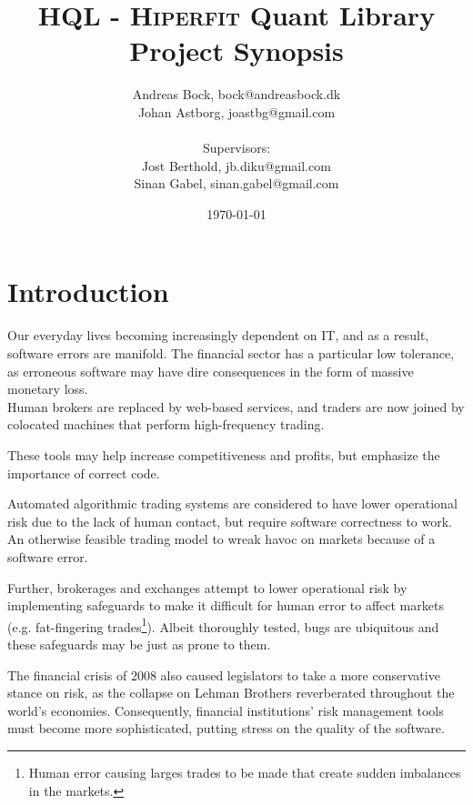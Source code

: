 \documentclass[11pt]{article}
\makeatletter
\def\Author{Andreas Bock, bock@andreasbock.dk\\
Johan Astborg, joastbg@gmail.com\\\\
Supervisors:\\
Jost Berthold, jb.diku@gmail.com\\
Sinan Gabel, sinan.gabel@gmail.com
}
\def\Title{\bf HQL - \textsc{Hiperfit} Quant Library\\ {\Large Project Synopsis}}
\makeatother
\begin{document}
\title{\Title}
\author{\Author}
\date{\today}
\maketitle

\begin{abstract}


\end{abstract}

\section*{Introduction}

Our everyday lives becoming increasingly dependent on IT, and as a result, software
errors are manifold. The financial sector has a particular low tolerance, as erroneous
software may have dire consequences in the form of massive monetary loss.\\
Human brokers are replaced by web-based services, and traders are now joined by
colocated machines that perform high-frequency trading.


These tools may help increase competitiveness and profits, but emphasize the
importance of correct code.

Automated algorithmic trading systems are considered to have lower operational risk due to the lack
of human contact, but require software correctness to work. An otherwise feasible
trading model to wreak havoc on markets because of a software error.

Further, brokerages and exchanges attempt to lower operational risk by implementing
safeguards to make it difficult for human error to affect markets (e.g. fat-fingering
trades\footnote{Human error causing larges trades to be made that create sudden
imbalances in the markets.}). Albeit thoroughly tested, bugs are ubiquitous and these
safeguards may be just as prone to them. 

The financial crisis of 2008 also caused legislators to take a more conservative
stance on risk, as the collapse on Lehman Brothers reverberated throughout
the world's economies.
Consequently, financial institutions' risk management tools must become more
sophisticated, putting stress on the quality of the software.
\end{document}
